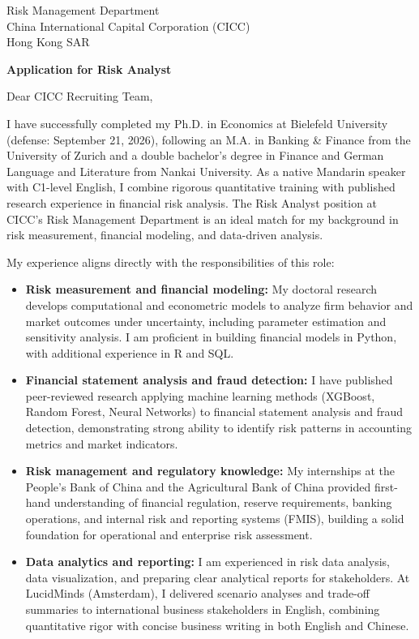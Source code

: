 \documentclass[11pt]{article}
\begin{document}
\vspace{0.1cm}

\noindent
Risk Management Department \\
China International Capital Corporation (CICC) \\
Hong Kong SAR

\vspace{0.12cm}

\noindent
\textbf{Application for Risk Analyst}

\vspace{0.1cm}

\noindent Dear CICC Recruiting Team,

I have successfully completed my Ph.D. in Economics at Bielefeld University (defense: September 21, 2026), following an M.A. in Banking \& Finance from the University of Zurich and a double bachelor's degree in Finance and German Language and Literature from Nankai University. As a native Mandarin speaker with C1-level English, I combine rigorous quantitative training with published research experience in financial risk analysis. The Risk Analyst position at CICC's Risk Management Department is an ideal match for my background in risk measurement, financial modeling, and data-driven analysis.

My experience aligns directly with the responsibilities of this role:

\begin{itemize}
    \item \textbf{Risk measurement and financial modeling:} My doctoral research develops computational and econometric models to analyze firm behavior and market outcomes under uncertainty, including parameter estimation and sensitivity analysis. I am proficient in building financial models in Python, with additional experience in R and SQL.
    \item \textbf{Financial statement analysis and fraud detection:} I have published peer-reviewed research applying machine learning methods (XGBoost, Random Forest, Neural Networks) to financial statement analysis and fraud detection, demonstrating strong ability to identify risk patterns in accounting metrics and market indicators.
    \item \textbf{Risk management and regulatory knowledge:} My internships at the People's Bank of China and the Agricultural Bank of China provided first-hand understanding of financial regulation, reserve requirements, banking operations, and internal risk and reporting systems (FMIS), building a solid foundation for operational and enterprise risk assessment.
    \item \textbf{Data analytics and reporting:} I am experienced in risk data analysis, data visualization, and preparing clear analytical reports for stakeholders. At LucidMinds (Amsterdam), I delivered scenario analyses and trade-off summaries to international business stakeholders in English, combining quantitative rigor with concise business writing in both English and Chinese.
\end{itemize}
\end{document}
